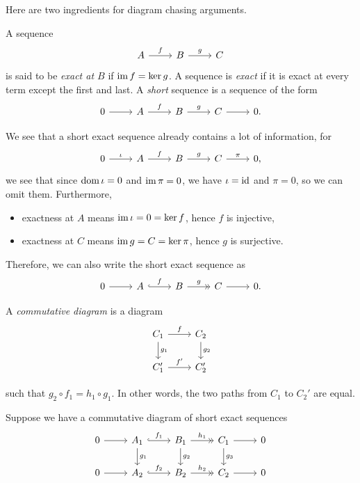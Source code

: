 Here are two ingredients for diagram chasing arguments.

\begin{definition}
    A sequence \[
        \begin{tikzcd}
            A \ar{r}{f} & B \ar{r}{g} & C
        \end{tikzcd}
    \] is said to be \emph{exact at \(B\)} if \(\operatorname{im} f = \ker g\). A sequence is \emph{exact} if it is exact at every term except the first and last. A \emph{short} sequence is a sequence of the form \[
        \begin{tikzcd}
            0 \ar{r} & A \ar{r}{f} & B \ar{r}{g} & C \ar{r} & 0.
        \end{tikzcd}
    \]
\end{definition}

We see that a short exact sequence already contains a lot of information, for \[
    \begin{tikzcd}
        0 \ar{r}{\i} & A \ar{r}{f} & B \ar{r}{g} & C \ar{r}{\pi} & 0,
    \end{tikzcd}
\] we see that since \(\operatorname{dom}\iota = 0\) and \(\operatorname{im}\pi = 0\), we have \(\iota = \mathrm{id}\) and \(\pi = 0\), so we can omit them. Furthermore, \begin{itemize}
    \item exactness at \(A\) means \(\operatorname{im}\iota = 0 = \ker f\), hence \(f\) is injective,
    \item exactness at \(C\) means \(\operatorname{im} g = C = \ker\pi\), hence \(g\) is surjective.
\end{itemize}
Therefore, we can also write the short exact sequence as \[
    \begin{tikzcd}
        0 \ar{r} & A \ar[hook]{r}{f} & B \ar[->>]{r}{g} & C \ar{r} & 0.
    \end{tikzcd}
\]

\begin{definition}
    A \emph{commutative diagram} is a diagram \[
        \begin{tikzcd}
            C_1 \ar{r}{f} \ar{d}{g_1} & C_2 \ar{d}{g_2} \\
            C_1' \ar{r}{f'} & C_2'
        \end{tikzcd}
    \]
\end{definition} such that \(g_2\circ f_1 = h_1\circ g_1\). In other words, the two paths from \(C_1\) to \(C_2'\) are equal.

\begin{lemma}
    Suppose we have a commutative diagram of short exact sequences \[
        \begin{tikzcd}
            0 \ar{r} & A_1 \ar[hook]{r}{f_1} \ar{d}{g_1} & B_1 \ar[->>]{r}{h_1} \ar{d}{g_2} & C_1 \ar{r} \ar{d}{g_3} & 0 \\
            0 \ar{r} & A_2 \ar[hook]{r}{f_2} & B_2 \ar[->>]{r}{h_2} & C_2 \ar{r} & 0
        \end{tikzcd}
    \]
\end{lemma}

